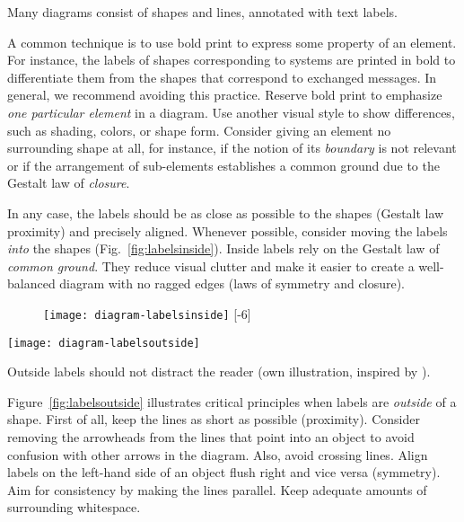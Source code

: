 Many diagrams consist of shapes and lines, annotated with text labels.

A common technique is to use bold print to express some property of an element. For instance, the labels of shapes corresponding to systems are printed in bold to differentiate them from the shapes that correspond to exchanged messages. In general, we recommend avoiding this practice. Reserve bold print to emphasize \emph{one particular element} in a diagram. Use another visual style to show differences, such as shading, colors, or shape form. Consider giving an element no surrounding shape at all, for instance, if the notion of its \emph{boundary} is not relevant or if the arrangement of sub-elements establishes a common ground due to the Gestalt law of \emph{closure}.

In any case, the labels should be as close as possible to the shapes (Gestalt law proximity) and precisely aligned. Whenever possible, consider moving the labels \emph{into} the shapes (Fig.~\ref{fig:labelsinside}). Inside labels rely on the Gestalt law of \emph{common ground}. They reduce visual clutter and make it easier to create a well-balanced diagram with no ragged edges (laws of symmetry and closure). 

\begin{figure}[t]
\centering
\texttt{[image: diagram-labelsinside]}
[-6\baselineskip]
\end{figure}

\begin{marginfigure}
\centering
\texttt{[image: diagram-labelsoutside]}
\caption{\label{fig:labelsoutside} Outside labels should not distract the reader (own illustration, inspired by \cite{Carter12}).}%
\end{marginfigure}

Figure~\ref{fig:labelsoutside} illustrates critical principles when labels are \emph{outside} of a shape. First of all, keep the lines as short as possible (proximity). Consider removing the arrowheads from the lines that point into an object to avoid confusion with other arrows in the diagram. Also, avoid crossing lines. Align labels on the left-hand side of an object flush right and vice versa (symmetry). Aim for consistency by making the lines parallel. Keep adequate amounts of surrounding whitespace.

